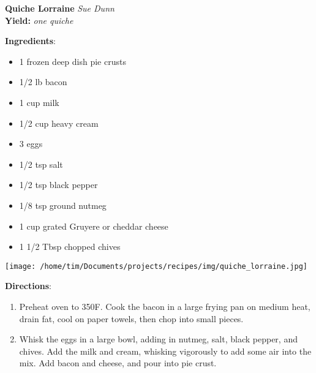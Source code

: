 \documentclass[11pt, twoside, openany]{book}
\begin{document}
\noindent\begin{minipage}[t]{\linewidth}%
{\Large\textbf{Quiche Lorraine}} \label{quiche-lorraine}\hfill\textit{Sue Dunn}\\
\textbf{Yield:} \textit{one quiche}\\
\noindent\begin{minipage}[t]{0.78\linewidth}%
\textbf{Ingredients}:\vspace{-3mm}
\begin{multicols}{2}
\begin{itemize}\setlength\itemsep{-1mm}
\item 1 frozen deep dish pie crusts
\item 1/2 lb bacon
\item 1 cup milk
\item 1/2 cup heavy cream
\item 3 eggs
\item 1/2 tsp salt
\item 1/2 tsp black pepper
\item 1/8 tsp ground nutmeg
\item 1 cup grated Gruyere or cheddar cheese
\item 1 1/2 Tbsp chopped chives
\end{itemize}
\end{multicols}
\end{minipage}
\noindent\begin{minipage}[t]{0.18\linewidth}
\centering \strut\vspace*{-\baselineskip}\newline
\texttt{[image: /home/tim/Documents/projects/recipes/img/quiche\_lorraine.jpg]}\\
\end{minipage}\vspace{3mm}
\textbf{Directions}:
\vspace{-3mm}\begin{enumerate}\setlength\itemsep{-1mm}
\item Preheat oven to 350F. Cook the bacon in a large frying pan on medium heat, drain fat, cool on paper towels, then chop into small pieces.
\item Whisk the eggs in a large bowl, adding in nutmeg, salt, black pepper, and chives. Add the milk and cream, whisking vigorously to add some air into the mix. Add bacon and cheese, and pour into pie crust.
\end{enumerate}
\end{minipage}\vspace{8mm}
\end{document}
